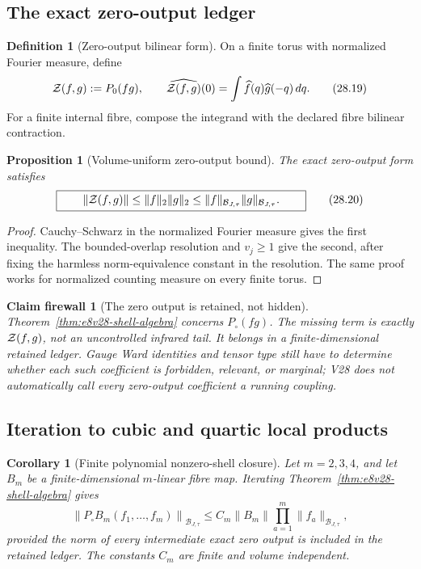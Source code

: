 \documentclass[11pt,oneside]{book}
\newtheorem{proposition}[theorem]{Proposition}
\newtheorem{corollary}[theorem]{Corollary}
\newtheorem{firewall}[theorem]{Claim firewall}
\theoremstyle{definition}
\newtheorem{definition}[theorem]{Definition}
\theoremstyle{remark}
\begin{document}
\subsection{The exact zero-output ledger}

\begin{definition}[Zero-output bilinear form]
\label{def:e8v28-zero-ledger}
On a finite torus with normalized Fourier measure, define
\[
 {\cal Z}(f,g):=P_0(fg),\qquad
 \widehat{{\cal Z}(f,g)}(0)
 =\int\widehat f(q)\widehat g(-q)\,dq.                            \tag{28.19}
\]
For a finite internal fibre, compose the integrand with the declared
fibre bilinear contraction.
\end{definition}

\begin{proposition}[Volume-uniform zero-output bound]
\label{prop:e8v28-zero-bound}
The exact zero-output form satisfies
\[
\boxed{\qquad
 \|{\cal Z}(f,g)\|
 \leq\|f\|_2\|g\|_2
 \leq
 \|f\|_{\mathcal B_{J,\tau}}
 \|g\|_{\mathcal B_{J,\tau}}.
\qquad}                                                           \tag{28.20}
\]
\end{proposition}

\begin{proof}
Cauchy--Schwarz in the normalized Fourier measure gives the first
inequality.  The bounded-overlap resolution and \(v_j\geq1\) give the
second, after fixing the harmless norm-equivalence constant in the
resolution.  The same proof works for normalized counting measure on
every finite torus.
\end{proof}

\begin{firewall}[The zero output is retained, not hidden]
\label{fire:e8v28-zero}
Theorem~\ref{thm:e8v28-shell-algebra} concerns \(P_\circ(fg)\).
The missing term is exactly \({\cal Z}(f,g)\), not an uncontrolled
infrared tail.  It belongs in a finite-dimensional retained ledger.
Gauge Ward identities and tensor type still have to determine whether
each such coefficient is forbidden, relevant, or marginal; V28 does
not automatically call every zero-output coefficient a running
coupling.
\end{firewall}

\subsection{Iteration to cubic and quartic local products}

\begin{corollary}[Finite polynomial nonzero-shell closure]
\label{cor:e8v28-polynomial}
Let \(m=2,3,4\), and let \(B_m\) be a finite-dimensional \(m\)-linear
fibre map.  Iterating Theorem~\ref{thm:e8v28-shell-algebra} gives
\[
 \left\|
 P_\circ B_m(f_1,\ldots,f_m)
 \right\|_{\mathcal B_{J,\tau}}
 \leq
 C_m\|B_m\|
 \prod_{a=1}^m\|f_a\|_{\mathcal B_{J,\tau}},                     \tag{28.21}
\]
provided the norm of every intermediate exact zero output is included
in the retained ledger.  The constants \(C_m\) are finite and volume
independent.
\end{corollary}
\end{document}
